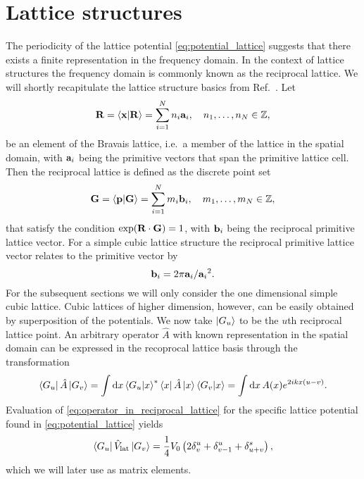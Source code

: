 \section{Lattice structures}

The periodicity of the lattice potential \cref{eq:potential_lattice}
suggests that there exists a finite representation in the frequency domain.
In the context of lattice structures the frequency domain is commonly known
as the reciprocal lattice. We will shortly recapitulate the lattice structure
basics from Ref.~\cite{Roessler2004}. Let
\begin{equation}
  \vb{R}
  =\bra{\vb{x}}\ket{\vb{R}}
  =\sum_{i=1}^Nn_i\vb{a}_i
  \qc n_1,\dots,n_N\in\mathbb{Z},
\end{equation}
be an element of the Bravais lattice, i.e.\ a member of the lattice in the
spatial domain, with $\vb{a}_i$ being the primitive vectors that span the
primitive lattice cell. Then the reciprocal lattice is defined as the discrete
point set
\begin{equation}
  \vb{G}
  =\bra{\vb{p}}\ket{\vb{G}}
  =\sum_{i=1}^Nm_i\vb{b}_i
  \qc m_1,\dots,m_N\in\mathbb{Z},
\end{equation}
that satisfy the condition $\exp(\vb{R}\cdot\vb{G})=1$, with $\vb{b}_i$ being
the reciprocal primitive lattice vector. For a simple cubic lattice structure
the reciprocal primitive lattice vector relates to the primitive vector by
\begin{equation}
  \vb{b}_i
  =2\pi\vb{a}_i/{{\vb{a}_i}^2}.
\end{equation}
For the subsequent sections we will only consider the one dimensional simple
cubic lattice. Cubic lattices of higher dimension, however, can be easily
obtained by superposition of the potentials. We now take $\ket{G_u}$ to be
the $u$th reciprocal lattice point. An arbitrary operator $\hat{A}$ with
known representation in the spatial domain can be expressed in the recoprocal
lattice basis through the transformation
\begin{equation}
  \bra{G_u}\hat{A}\ket{G_v}
  =\int\dd{x}\bra{G_u}\ket{x}^*\bra{x}\hat{A}\ket{x}\bra{G_v}\ket{x}
  =\int\dd{x}A(x)e^{2ikx(u-v)}
  \label{eq:operator_in_reciprocal_lattice}.
\end{equation}
Evaluation of \cref{eq:operator_in_reciprocal_lattice} for the specific
lattice potential found in \cref{eq:potential_lattice} yields
\begin{equation}
  \bra{G_u}\hat{V}_\text{lat}\ket{G_v}
  =\frac{1}{4}V_0\left(2\delta^u_v+\delta^u_{v-1}+\delta^s_{u+v}\right)
  \label{eq:potential_in_reciprocal_lattice},
\end{equation}
which we will later use as matrix elements.

